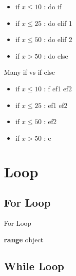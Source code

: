 \documentclass{beamer}
\begin{document}
\begin{frame}
    \begin{example}
        
        \begin{itemize}
            \item if $x \le 10$ : do if
            \item if $x \le 25$ : do elif 1
            \item if $x \le 50$ : do elif 2
            \item if $x > 50$ : do else
        \end{itemize}
    \end{example}
\end{frame}

\begin{frame}
    \begin{alertblock}{Many if vs if-else}
        
        \begin{itemize}
            \item if $x \le 10$ : f ef1 ef2
            \item if $x \le 25$ : ef1 ef2
            \item if $x \le 50$ : ef2
            \item if $x > 50$ : e
        \end{itemize}
    \end{alertblock}

\end{frame}

\section{Loop}
\subsection{For Loop}
\begin{frame}{For Loop}
    \begin{block}{\textbf{range} object}

    \end{block}
\end{frame}
\subsection{While Loop}
\end{document}
